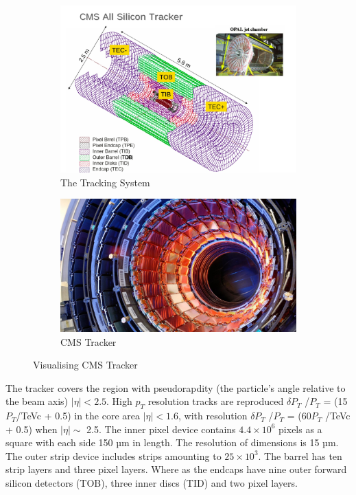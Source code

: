 \begin{figure}[h]
     \centering
     \begin{subfigure}[b]{0.45\textwidth}
         \centering
         \includegraphics[width=\textwidth]{images/Track1.jpg}
         \caption{The Tracking System}
         \label{fig:track1}
     \end{subfigure}
     \hfill
    \begin{subfigure}[b]{0.45\textwidth}
         \centering
         \includegraphics[width=\textwidth]{images/Track2.jpg}
         \caption{CMS Tracker}
         \label{fig:track2}
     \end{subfigure}
     \hfill
     \caption{Visualising CMS Tracker}
        \label{fig:CMS Tracking System}
\end{figure}
The tracker covers the region with pseudorapdity (the particle's angle relative to the beam axis) $|\eta|< 2.5$. High $p_{T}$ resolution tracks are reproduced  $\delta P_{T}$ /$P_{T}$ = (15$P_{T}$/TeVc + 0.5) in the core area $|\eta| < 1.6$, with resolution $\delta P_{T}$ /$P_{T}$ = (60$P_{T}$ /TeVc + 0.5) when $|\eta|\sim$ 2.5.
The inner pixel device contains $4.4 \times 10^{6}$ pixels as a square with each side 150 µm in length. The resolution of dimensions is 15 µm. The outer strip device includes strips amounting to $25 \times 10^{3}$. The barrel has ten strip layers and three pixel layers. Where as the endcaps have nine outer forward silicon detectors (TOB), three inner discs (TID) and two pixel layers.
